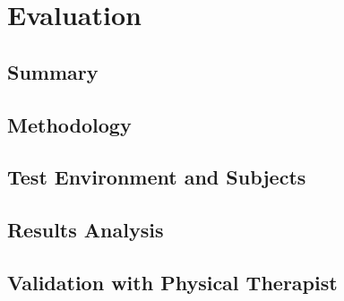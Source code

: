 \chapter{Evaluation}
\label{sec:evaluation}

\section*{Summary}


\section{Methodology}

\section{Test Environment and Subjects}

\section{Results Analysis}

\section{Validation with Physical Therapist}